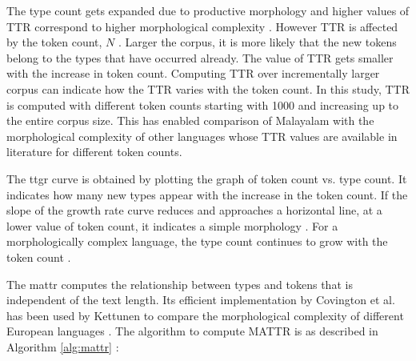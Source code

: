 The type count gets expanded due to productive morphology and higher values of
TTR correspond to higher morphological complexity \cite{bentz2016comparison}.
However TTR is affected by the token count, $N$ \cite{covington2010cutting}.
Larger the corpus, it is more likely that the new tokens belong to the types
that have occurred already. The value of TTR gets smaller with the increase in
token count. Computing TTR over incrementally larger corpus can indicate how
the TTR varies with the token count. In this study, TTR is computed with
different token counts starting with 1000 and increasing up to the entire corpus
size. This has enabled comparison of Malayalam with the morphological
complexity of other languages whose TTR values are available in literature for
different token counts.

The \gls{ttgr} curve is obtained by plotting the graph of
token count vs. type count. It indicates how many new types appear with the
increase in the token count. If the slope of the growth rate curve reduces and
approaches a horizontal line, at a lower value of token count, it indicates a
simple morphology \cite{bharadwaja2007statistical}. For a morphologically
complex language, the type count continues to grow with the token count
\cite{htay2007statistical}.

The \gls{mattr} computes the relationship between
types and tokens that is independent of the text length. Its efficient
implementation by Covington et al. has been used by Kettunen to compare the
morphological complexity of different European languages
\cite{covington2010cutting,kettunen2014can}. The algorithm to compute MATTR is
as described in Algorithm \ref{alg:mattr} \cite{fidler2018taming}:





